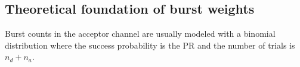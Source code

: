 \subsection{Theoretical foundation of burst weights}
\label{sec:burstweights_theory}
Burst counts in the acceptor channel are usually modeled with a binomial distribution
where the success probability is the PR and the number of trials is $n_d + n_a$.